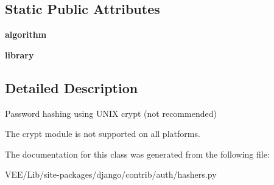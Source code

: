 \subsection*{Static Public Attributes}
\begin{DoxyCompactItemize}
\item 
\mbox{\label{classdjango_1_1contrib_1_1auth_1_1hashers_1_1_crypt_password_hasher_a5f3a18e04571d450994d267ac3ecd6e9}} 
{\bfseries algorithm}
\item 
\mbox{\label{classdjango_1_1contrib_1_1auth_1_1hashers_1_1_crypt_password_hasher_a0c7ccf9abe54e88440f8613db1b76f22}} 
{\bfseries library}
\end{DoxyCompactItemize}


\subsection{Detailed Description}
\begin{DoxyVerb}Password hashing using UNIX crypt (not recommended)

The crypt module is not supported on all platforms.
\end{DoxyVerb}
 

The documentation for this class was generated from the following file\+:\begin{DoxyCompactItemize}
\item 
V\+E\+E/\+Lib/site-\/packages/django/contrib/auth/hashers.\+py\end{DoxyCompactItemize}
